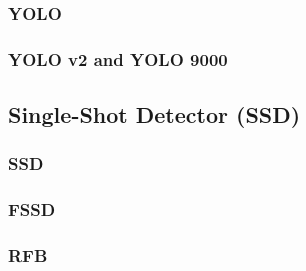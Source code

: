\subsubsection{YOLO}
\label{sec:yolo}
\subsubsection{YOLO v2 and YOLO 9000}

\subsection*{Single-Shot Detector (SSD)}
\label{sec:ssd}
\subsubsection{SSD}
\subsubsection{FSSD}
\subsubsection{RFB}




